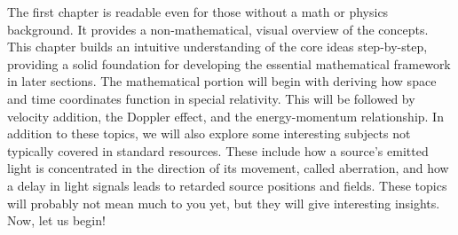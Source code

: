 The first chapter is readable even for those without a math or physics background. It provides a non-mathematical, visual overview of the concepts. This chapter builds an intuitive understanding of the core ideas step-by-step, providing a solid foundation for developing the essential mathematical framework in later sections. The mathematical portion will begin with deriving how space and time coordinates function in special relativity. This will be followed by velocity addition, the Doppler effect, and the energy-momentum relationship. In addition to these topics, we will also explore some interesting subjects not typically covered in standard resources. These include how a source’s emitted light is concentrated in the direction of its movement, called aberration, and how a delay in light signals leads to retarded source positions and fields. These topics will probably not mean much to you yet, but they will give interesting insights.
\vspace{1cm} \newline
Now, let us begin!


\newpage